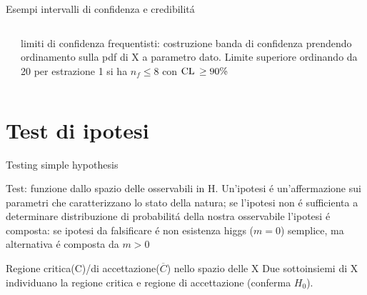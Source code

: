 \begin{wordonframe}{Esempi intervalli di confidenza e credibilit\'a}
\begin{columns}[T]
\begin{column}{0.3\textwidth}
\end{column}
	\begin{column}{0.7\textwidth}
limiti di confidenza frequentisti: costruzione banda di confidenza prendendo ordinamento sulla pdf di X a parametro dato. Limite superiore ordinando da 20 per estrazione 1 si ha $n_f\leq8$ con $\operatorname{CL}{}\geq90\%$
\end{column}
\end{columns}
\end{wordonframe}

\section{Test di ipotesi}

\begin{frame}{Testing simple hypothesis}

\begin{block}{Test: funzione dallo spazio delle osservabili in H.}
Un'ipotesi \'e un'affermazione sui parametri che caratterizzano lo stato della natura; se l'ipotesi non \'e sufficienta a determinare distribuzione di probabilit\'a della nostra osservabile l'ipotesi \'e composta: se ipotesi da falsificare \'e non esistenza higgs ($m=0$) semplice, ma alternativa \'e composta da $m>0$
\end{block}

\begin{block}{Regione critica(C)/di accettazione($\overline{C}$) nello spazio delle X}
Due sottoinsiemi di X individuano la regione critica e regione di accettazione (conferma $H_0$).
\end{block}

\end{frame}


